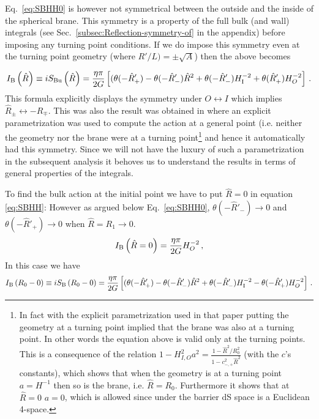 \documentclass[a4paper,11pt]{article}
\numberwithin{equation}{section}
\newcommand{\be}{\begin{equation}}
\newcommand{\ee}{\end{equation}}
\numberwithin{equation}{section}
\begin{document}
 
Eq.~\eqref{eq:SBHH0} is however not symmetrical between the outside and the inside of the spherical brane. This symmetry is a property of the full bulk (and wall) integrals (see  Sec.~\eqref{subsec:Reflection-symmetry-of} in the appendix) before imposing any turning point conditions. If we do impose this symmetry even at the turning point geometry (where $R'/L)=\pm \sqrt A$) then the above becomes
 
 \begin{equation}
I_{{\rm B}}\left(\hat{R}\right)\equiv iS_{{\rm Bu}}\left(\hat{R}\right)=\frac{\eta\pi}{2G}\left[(\theta(-\hat{R}'_{+})-\theta(-\hat{R}'_{-})\hat{R}^{2}+\theta(-\hat{R}'_{-})H_{{\rm I}}^{-2}+\theta(\hat{R}'_{+})H_{O}^{-2}\right] \,.\label{eq:SBHH}
\end{equation}
This formula explicitly displays the symmetry under $O\leftrightarrow I$ which implies $\hat{R}_{\pm}\leftrightarrow-\hat{R}_{\mp}$. This was also the result was obtained in \cite{DeAlwis:2019rxg} where an explicit parametrization was used to compute the action at a general point (i.e. neither the geometry nor the brane were at a turning point\footnote{In fact with the explicit parametrization used in that paper putting the geometry at a turning point implied that the brane was also at a turning point. In other words the equation above is valid only at the turning points. This is a consequence of the relation $1-H^2_{I,O}a^2=\frac{1-{\hat R}^2/R_0^2 }{1-c^2_{-,+}{\hat R}^2} $ (with the $c$'s constants), which shows that when the geometry is at a turning point $a=H^{-1} $ then so is the brane, i.e. $\hat R=R_0$. Furthermore it shows that at $\hat R=0$ $a=0$, which is allowed since under the barrier dS space is a Euclidean 4-space.\label{foot:explicit}} and hence it automatically had this symmetry. Since we will not have the luxury of such a parametrization in the subsequent analysis it behoves us to understand the results in terms of general properties of the integrals.

To find the bulk action at 
 the initial point   we have to put  $\hat{R}=0$ in  equation \eqref{eq:SBHH}: However as argued below Eq.~\eqref{eq:SBHH0},  $\theta(-\hat{R}'_{-})\rightarrow0$ 
and $\theta(-\hat{R}'_{+})\rightarrow0$ when $\hat R=R_1\rightarrow 0$.
\be
I_{{\rm B}}\left(\hat{R}=0\right)=\frac{\eta\pi}{2G}H_{O}^{-2} \,,
\ee
 In this case we have 
 \begin{equation}
I_{{\rm B}}\left({R_0-0}\right)\equiv iS_{{\rm B}}\left({R_0}-0\right)=\frac{\eta\pi}{2G}\left[(\theta(-\hat{R}'_{+})-\theta(-\hat{R}'_{-})\hat{R}^{2}+\theta(-\hat{R}'_{-})H_{{\rm I}}^{-2}-\theta(-\hat{R}'_{+})H_{O}^{-2}\right] \,.\label{eq:SBHH'}
\end{equation}
\end{document}
